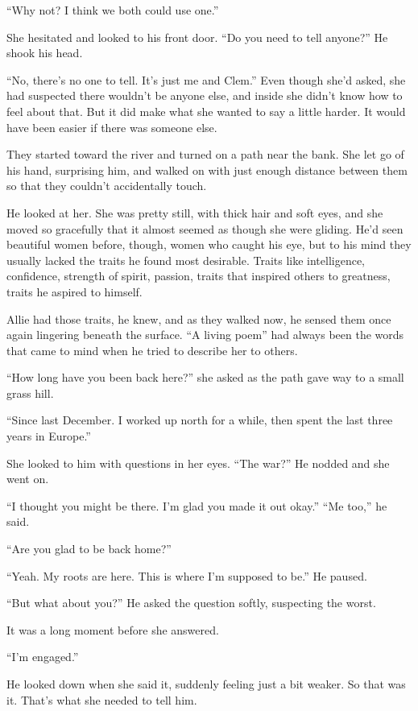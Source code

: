 \documentclass[10pt, twoside, openright]{book}
\begin{document}
``Why not? I think we both could use one.''

She hesitated and looked to his front door. ``Do you need to tell
anyone?'' He shook his head.


``No, there's no one to tell. It's just me and Clem.'' Even though she'd
asked, she had suspected there wouldn't be anyone else, and inside she
didn't know how to feel about that. But it did make what she wanted to
say a little harder. It would have been easier if there was someone
else.

They started toward the river and turned on a path near the bank. She
let go of his hand, surprising him, and walked on with just enough
distance between them so that they couldn't accidentally touch.

He looked at her. She was pretty still, with thick hair and soft eyes,
and she moved so gracefully that it almost seemed as though she were
gliding. He'd seen beautiful women before, though, women who caught his
eye, but to his mind they usually lacked the traits he found most
desirable. Traits like intelligence, confidence, strength of spirit,
passion, traits that inspired others to greatness, traits he aspired to
himself.

Allie had those traits, he knew, and as they walked now, he sensed them
once again lingering beneath the surface. ``A living poem'' had always
been the words that came to mind when he tried to describe her to
others.

``How long have you been back here?'' she asked as the path gave way to
a small grass hill.

``Since last December. I worked up north for a while, then spent the
last three years in Europe.''


She looked to him with questions in her eyes. ``The war?'' He nodded and
she went on.

``I thought you might be there. I'm glad you made it out okay.'' ``Me
too,'' he said.

``Are you glad to be back home?''

``Yeah. My roots are here. This is where I'm supposed to be.'' He
paused.


``But what about you?'' He asked the question softly, suspecting the
worst.


It was a long moment before she answered.

``I'm engaged.''


He looked down when she said it, suddenly feeling just a bit weaker. So
that was it. That's what she needed to tell him.
\end{document}
